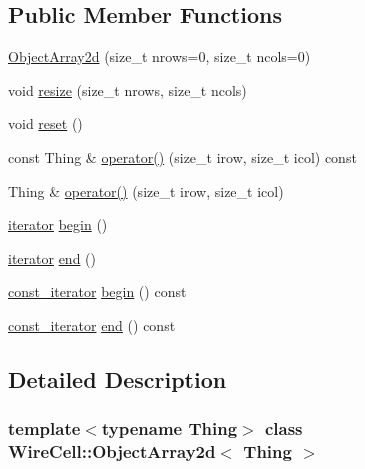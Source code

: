 \subsection*{Public Member Functions}
\begin{DoxyCompactItemize}
\item 
\hyperlink{class_wire_cell_1_1_object_array2d_a4fa3cec6f7d93ab392464dff04b1061e}{Object\+Array2d} (size\+\_\+t nrows=0, size\+\_\+t ncols=0)
\item 
void \hyperlink{class_wire_cell_1_1_object_array2d_ae7e6ea58247ef094b06452cbe9fe70e6}{resize} (size\+\_\+t nrows, size\+\_\+t ncols)
\item 
void \hyperlink{class_wire_cell_1_1_object_array2d_a72e321e7877dea606a36cb07816cfa84}{reset} ()
\item 
const Thing \& \hyperlink{class_wire_cell_1_1_object_array2d_ab0f19f4fa69292149a91b8d735896a0a}{operator()} (size\+\_\+t irow, size\+\_\+t icol) const
\item 
Thing \& \hyperlink{class_wire_cell_1_1_object_array2d_a375dbad99a4487e7a535d118f24131e8}{operator()} (size\+\_\+t irow, size\+\_\+t icol)
\item 
\hyperlink{class_wire_cell_1_1_object_array2d_a08055a2eb80a3d4de9dcd72e5da07227}{iterator} \hyperlink{class_wire_cell_1_1_object_array2d_a76ff38c108ab3a9b1678c1a3ccca8404}{begin} ()
\item 
\hyperlink{class_wire_cell_1_1_object_array2d_a08055a2eb80a3d4de9dcd72e5da07227}{iterator} \hyperlink{class_wire_cell_1_1_object_array2d_a777fae88041cdb0086d801ff8099ede4}{end} ()
\item 
\hyperlink{class_wire_cell_1_1_object_array2d_a4ac09025b41a1ab92f472eeae2cc0352}{const\+\_\+iterator} \hyperlink{class_wire_cell_1_1_object_array2d_a662bd618ec32a52c93fe99a62f900a16}{begin} () const
\item 
\hyperlink{class_wire_cell_1_1_object_array2d_a4ac09025b41a1ab92f472eeae2cc0352}{const\+\_\+iterator} \hyperlink{class_wire_cell_1_1_object_array2d_aa3ceab62503002c04e43319935added5}{end} () const
\end{DoxyCompactItemize}


\subsection{Detailed Description}
\subsubsection*{template$<$typename Thing$>$\newline
class Wire\+Cell\+::\+Object\+Array2d$<$ Thing $>$}



